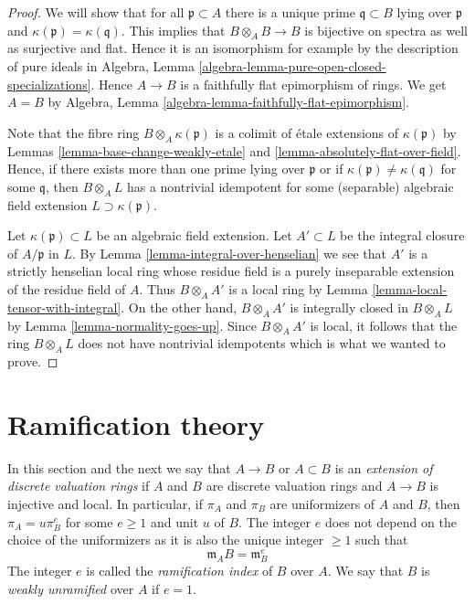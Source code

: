 \begin{proof}
We will show that for all $\mathfrak p \subset A$ there is a unique
prime $\mathfrak q \subset B$ lying over $\mathfrak p$ and
$\kappa(\mathfrak p) = \kappa(\mathfrak q)$.
This implies that $B \otimes_A B \to B$ is bijective on spectra
as well as surjective and flat. Hence it is an isomorphism
for example by the description of pure ideals in
Algebra, Lemma \ref{algebra-lemma-pure-open-closed-specializations}.
Hence $A \to B$ is a faithfully flat epimorphism of rings. We get
$A = B$ by
Algebra, Lemma \ref{algebra-lemma-faithfully-flat-epimorphism}.

\medskip\noindent
Note that the fibre ring $B \otimes_A \kappa(\mathfrak p)$
is a colimit of \'etale extensions of $\kappa(\mathfrak p)$ by
Lemmas \ref{lemma-base-change-weakly-etale} and
\ref{lemma-absolutely-flat-over-field}.
Hence, if there exists more than one prime lying over $\mathfrak p$
or if $\kappa(\mathfrak p) \not = \kappa(\mathfrak q)$ for some $\mathfrak q$,
then $B \otimes_A L$ has a nontrivial idempotent for some (separable)
algebraic field extension $L \supset \kappa(\mathfrak p)$.

\medskip\noindent
Let $\kappa(\mathfrak p) \subset L$ be an algebraic field extension.
Let $A' \subset L$ be the integral closure of $A/\mathfrak p$ in $L$.
By Lemma \ref{lemma-integral-over-henselian}
we see that $A'$ is a strictly henselian local ring
whose residue field is a purely inseparable extension of the residue
field of $A$. Thus $B \otimes_A A'$ is a local ring by
Lemma \ref{lemma-local-tensor-with-integral}.
On the other hand, $B \otimes_A A'$ is integrally closed in
$B \otimes_A L$ by Lemma \ref{lemma-normality-goes-up}.
Since $B \otimes_A A'$ is local, it follows that the ring
$B \otimes_A L$ does not have nontrivial
idempotents which is what we wanted to prove.
\end{proof}











\section{Ramification theory}
\label{section-ramification}


\noindent
In this section and the next we say that $A \to B$ or $A \subset B$ is an
{\it extension of discrete valuation rings} if $A$ and $B$ are
discrete valuation rings and $A \to B$ is injective and local.
In particular, if $\pi_A$ and $\pi_B$ are uniformizers of
$A$ and $B$, then $\pi_A = u \pi_B^e$ for some $e \geq 1$ and unit
$u$ of $B$. The integer $e$ does not depend on the choice of
the uniformizers as it is also the unique integer $\geq 1$ such that
$$
\mathfrak m_A B = \mathfrak m_B^e
$$
The integer $e$ is called the {\it ramification index} of $B$ over $A$.
We say that $B$ is {\it weakly unramified} over $A$ if $e = 1$.

